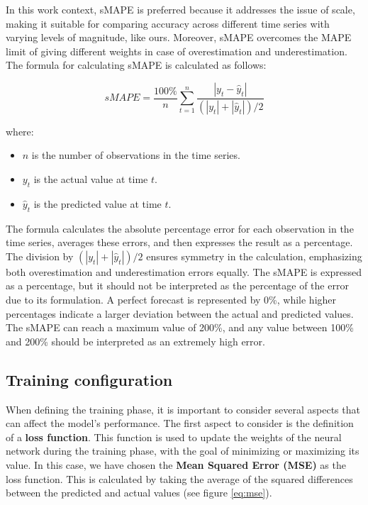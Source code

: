 In this work context, sMAPE is preferred because it addresses the issue of scale, making it suitable for comparing accuracy across different time series with varying levels of magnitude, like ours. Moreover, sMAPE overcomes the MAPE limit of giving different weights in case of overestimation and underestimation. The formula for calculating sMAPE is calculated as follows:

\begin{equation}
sMAPE = \frac{100\%}{n} \sum_{t=1}^{n} \frac{|y_t - \hat{y}_t|}{( |y_t| + |\hat{y}_t| ) / 2}
\end{equation}

where:
\begin{itemize}[noitemsep,  leftmargin=*]
  \item[] \( n \) is the number of observations in the time series.
  \item[] \( y_t \) is the actual value at time \( t \).
  \item[] \( \hat{y}_t \) is the predicted value at time \( t \).
\end{itemize}

The formula calculates the absolute percentage error for each observation in the time series, averages these errors, and then expresses the result as a percentage. The division by \( (|y_t| + |\hat{y}_t|) / 2 \) ensures symmetry in the calculation, emphasizing both overestimation and underestimation errors equally. The sMAPE is expressed as a percentage, but it should not be interpreted as the percentage of the error due to its formulation. A perfect forecast is represented by 0\%, while higher percentages indicate a larger deviation between the actual and predicted values. The sMAPE can reach a maximum value of 200\%, and any value between 100\% and 200\% should be interpreted as an extremely high error.

\subsection{Training configuration}

When defining the training phase, it is important to consider several aspects that can affect the model's performance.
The first aspect to consider is the definition of a \textbf{loss function}. This function is used to update the weights of the neural network during the training phase, with the goal of minimizing or maximizing its value. In this case, we have chosen the \textbf{Mean Squared Error (MSE)} as the loss function. This is calculated by taking the average of the squared differences between the predicted and actual values (see figure \ref{eq:mse}).


